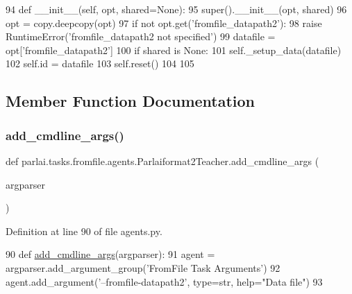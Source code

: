 \begin{DoxyCode}
94     \textcolor{keyword}{def }\_\_init\_\_(self, opt, shared=None):
95         super().\_\_init\_\_(opt, shared)
96         opt = copy.deepcopy(opt)
97         \textcolor{keywordflow}{if} \textcolor{keywordflow}{not} opt.get(\textcolor{stringliteral}{'fromfile\_datapath2'}):
98             \textcolor{keywordflow}{raise} RuntimeError(\textcolor{stringliteral}{'fromfile\_datapath2 not specified'})
99         datafile = opt[\textcolor{stringliteral}{'fromfile\_datapath2'}]
100         \textcolor{keywordflow}{if} shared \textcolor{keywordflow}{is} \textcolor{keywordtype}{None}:
101             self.\_setup\_data(datafile)
102         self.id = datafile
103         self.reset()
104 
105 
\end{DoxyCode}


\subsection{Member Function Documentation}
\mbox{\label{classparlai_1_1tasks_1_1fromfile_1_1agents_1_1Parlaiformat2Teacher_adbba4165f1d6690562c545fb48d1af06}} 
\subsubsection{\texorpdfstring{add\+\_\+cmdline\+\_\+args()}{add\_cmdline\_args()}}
{\footnotesize\ttfamily def parlai.\+tasks.\+fromfile.\+agents.\+Parlaiformat2\+Teacher.\+add\+\_\+cmdline\+\_\+args (\begin{DoxyParamCaption}\item[{}]{argparser }\end{DoxyParamCaption})\hspace{0.3cm}{\ttfamily [static]}}



Definition at line 90 of file agents.\+py.


\begin{DoxyCode}
90     \textcolor{keyword}{def }\hyperlink{namespaceparlai_1_1agents_1_1drqa_1_1config_a62fdd5554f1da6be0cba185271058320}{add\_cmdline\_args}(argparser):
91         agent = argparser.add\_argument\_group(\textcolor{stringliteral}{'FromFile Task Arguments'})
92         agent.add\_argument(\textcolor{stringliteral}{'--fromfile-datapath2'}, type=str, help=\textcolor{stringliteral}{"Data file"})
93 
\end{DoxyCode}


